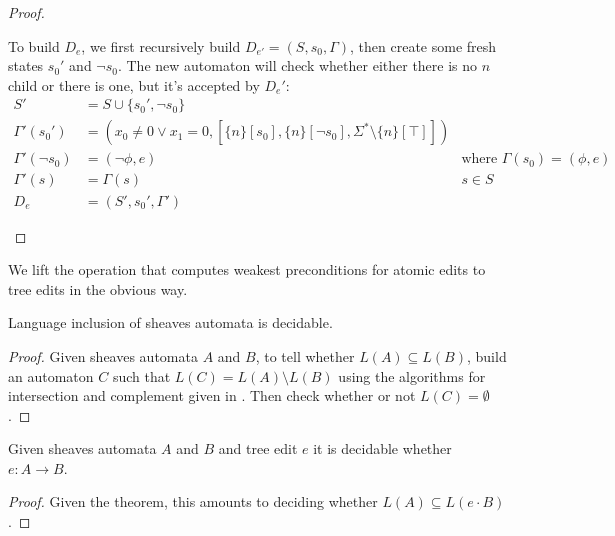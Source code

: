 \begin{proof}
\begin{itemize}
To build $D_e$, we first recursively build $D_{e'}=(S,s_0,\Gamma)$, then
create some fresh states $s_0'$ and $\lnot s_0$. The new automaton will
check whether either there is no $n$ child or there is one, but it's
accepted by $D_e'$:
\begin{align*}
    S' &= S \cup \{s_0',\lnot s_0\} \\
    \Gamma'(s_0') &= (x_0\ne0 \lor x_1=0,[\{n\}[s_0],\{n\}[\lnot s_0],\Sigma^*\setminus\{n\}[\top]]) \\
    \Gamma'(\lnot s_0) &= (\lnot\phi,e) & \mbox{where }\Gamma(s_0)=(\phi,e) \\
    \Gamma'(s) &= \Gamma(s) & s \in S \\
    D_e &= (S',s_0',\Gamma')
\end{align*}
\end{itemize}
\vspace*{-6ex}
\end{proof}
We lift the operation that computes weakest preconditions for atomic edits
to tree edits in the obvious way.

\begin{lemma}
Language inclusion of sheaves automata is
decidable.
\end{lemma}
\begin{proof}
Given sheaves automata $A$ and $B$, to tell whether $L(A)\subseteq L(B)$, build an automaton $C$ such that $L(C)=L(A)\setminus L(B)$ using the algorithms for intersection and complement given in \cite{DalzilioS:POPL04}. Then check whether or not $L(C)=\emptyset$.
\end{proof}
\begin{corollary}
Given sheaves automata $A$ and $B$ and tree edit $e$ it is decidable whether $e:A\rightarrow B$.
\end{corollary}
\begin{proof}
Given the theorem, this amounts to deciding whether $L(A)\subseteq L(e\cdot
B)$.
\end{proof}





